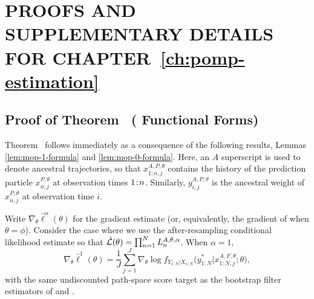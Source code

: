 \chapter{PROOFS AND SUPPLEMENTARY DETAILS FOR CHAPTER~\ref{ch:pomp-estimation}}
\label{app:pomp-estimation}


\section[Endpoint Functional Forms for the Discounted Score Estimator]{Proof of Theorem~{\thmMopFunctionalForms} ( Functional Forms)}
\label{sec:app07-s1}


\label{appendix:functional}


Theorem~{\thmMopFunctionalForms} follows immediately as a consequence of the following results, Lemmas \ref{lem:mop-1-formula} and \ref{lem:mop-0-formula}.
Here, an $A$ superscript is used to denote ancestral trajectories, so that $x_{1:n,j}^{A, P,\theta}$ contains the history of the prediction particle $x_{n,j}^{P,\theta}$ at observation times ${1}\!:\!{n}$.
Similarly, $g_{i,j}^{A,P,\theta}$ is the ancestral weight of $x_{n,j}^{P,\theta}$ at observation time $i$.

\begin{lem}
\label{lem:mop-1-formula}
Write $\nabla_\theta \hat\ell^\alpha(\theta)$ for the  gradient estimate (or, equivalently, the gradient of  when $\theta=\phi$).
Consider the case where we use the after-resampling conditional likelihood estimate so that $\hat{\mathcal{L}}(\theta) = \prod_{n=1}^N L_n^{A, \theta, \alpha}$.
When $\alpha=1$,
    \begin{equation}
        \nabla_\theta \hat{\ell}^1(\theta) 
        = \frac{1}{J}\sum_{j=1}^J \nabla_\theta \log f_{Y_{1:N}|X_{1:N}}\big(y_{1:N}^* | x_{1:N,j}^{A, F,\theta};\theta\big),
    \end{equation}
    with the same undiscounted path-space score target as the bootstrap filter estimators of \cite{poyiadjis11} and \cite{scibior21}.
\end{lem}


